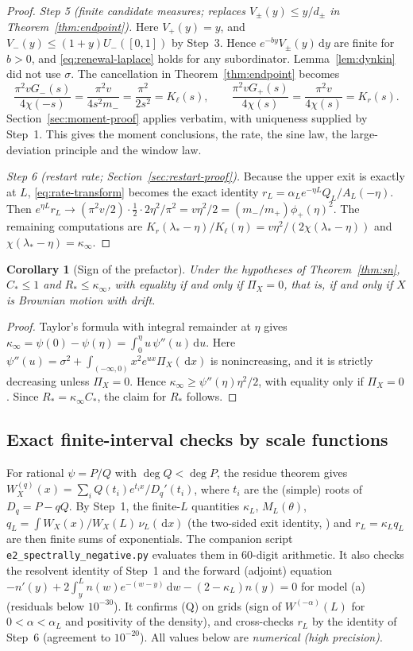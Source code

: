 \documentclass[11pt,a4paper]{article}
\newtheorem{corollary}[theorem]{Corollary}
\theoremstyle{definition}
\theoremstyle{remark}
\newcommand{\1}{\mathbf 1}
\newcommand{\dd}{\,\mathrm d}
\newcommand{\Kl}{K_{\ell}}
\newcommand{\Kr}{K_{r}}
\begin{document}
\begin{proof}
\emph{Step 5 (finite candidate measures; replaces $V_\pm(y)\le y/d_\pm$ in Theorem~\ref{thm:endpoint}).}
Here $V_+(y)=y$, and $V_-(y)\le(1+y)U_-([0,1])$ by Step~3. Hence $e^{-by}V_\pm(y)\dd y$ are finite for $b>0$, and \eqref{eq:renewal-laplace} holds for any subordinator. Lemma~\ref{lem:dynkin} did not use $\sigma$. The cancellation in Theorem~\ref{thm:endpoint} becomes
\[
 \frac{\pi^2vG_-(s)}{4\chi(-s)}=\frac{\pi^2v}{4s^2m_-}=\frac{\pi^2}{2s^2}=\Kl(s),\qquad
 \frac{\pi^2vG_+(s)}{4\chi(s)}=\frac{\pi^2v}{4\chi(s)}=\Kr(s).
\]
Section~\ref{sec:moment-proof} applies verbatim, with uniqueness supplied by Step~1. This gives the moment conclusions, the rate, the sine law, the large-deviation principle and the window law.

\emph{Step 6 (restart rate; Section~\ref{sec:restart-proof}).}
Because the upper exit is exactly at $L$, \eqref{eq:rate-transform} becomes the exact identity
$r_L=\alpha_Le^{-\eta L}Q_L/A_L(-\eta)$. Then $e^{\eta L}r_L\to(\pi^2v/2)\cdot\tfrac12\cdot2\eta^2/\pi^2=v\eta^2/2=(m_-/m_+)\phi_+(\eta)^2$. The remaining computations are $\Kr(\lambda_*-\eta)/\Kl(\eta)=v\eta^2/(2\chi(\lambda_*-\eta))$ and $\chi(\lambda_*-\eta)=\kappa_\infty$.
\end{proof}

\begin{corollary}[Sign of the prefactor]\label{cor:sn-sign}
Under the hypotheses of Theorem~\ref{thm:sn}, $C_*\le1$ and $R_*\le\kappa_\infty$, with equality if and only if $\Pi_X=0$, that is, if and only if $X$ is Brownian motion with drift.
\end{corollary}
\begin{proof}
Taylor's formula with integral remainder at $\eta$ gives $\kappa_\infty=\psi(0)-\psi(\eta)=\int_0^\eta u\,\psi''(u)\dd u$. Here $\psi''(u)=\sigma^2+\int_{(-\infty,0)}x^2e^{ux}\Pi_X(\dd x)$ is nonincreasing, and it is strictly decreasing unless $\Pi_X=0$. Hence $\kappa_\infty\ge\psi''(\eta)\eta^2/2$, with equality only if $\Pi_X=0$. Since $R_*=\kappa_\infty C_*$, the claim for $R_*$ follows.
\end{proof}

\subsection*{Exact finite-interval checks by scale functions}
For rational $\psi=P/Q$ with $\deg Q<\deg P$, the residue theorem gives $W_X^{(q)}(x)=\sum_iQ(t_i)e^{t_ix}/D_q'(t_i)$, where $t_i$ are the (simple) roots of $D_q=P-qQ$. By Step~1, the finite-$L$ quantities $\kappa_L$, $M_L(\theta)$, $q_L=\int W_X(x)/W_X(L)\,\nu_L(\dd x)$ (the two-sided exit identity, \cite[Ch.~8]{kyprianoubook}) and $r_L=\kappa_Lq_L$ are then finite sums of exponentials. The companion script \texttt{e2\_spectrally\_negative.py} evaluates them in 60-digit arithmetic. It also checks the resolvent identity of Step~1 and the forward (adjoint) equation $-n'(y)+2\int_y^Ln(w)e^{-(w-y)}\dd w-(2-\kappa_L)n(y)=0$ for model (a) (residuals below $10^{-30}$). It confirms (Q) on grids (sign of $W^{(-\alpha)}(L)$ for $0<\alpha<\alpha_L$ and positivity of the density), and cross-checks $r_L$ by the identity of Step~6 (agreement to $10^{-20}$). All values below are \emph{numerical (high precision)}.
\end{document}
